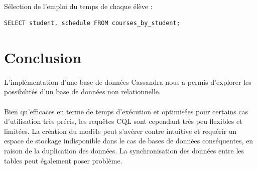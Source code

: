 \documentclass[a4paper, 11pt]{article}
\begin{document}
\paragraph{}
Sélection de l'emploi du temps de chaque élève :
\begin{tcolorbox}
\begin{lstlisting}
SELECT student, schedule FROM courses_by_student;
\end{lstlisting}
\end{tcolorbox}


\section{Conclusion}
\paragraph{}
L'implémentation d'une base de données Cassandra nous a permis d'explorer les possibilités d'un base de données non relationnelle.

\paragraph{}
Bien qu'efficaces en terme de temps d'exécution et optimisées pour certains cas d'utilisation très précis, les requêtes CQL sont cependant très peu flexibles et limitées. La création du modèle peut s'avérer contre intuitive et requérir un espace de stockage indisponible dans le cas de bases de données conséquentes, en raison de la duplication des données. La synchronisation des données entre les tables peut également poser problème.
\end{document}
